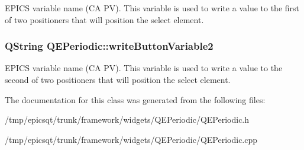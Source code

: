 \label{classQEPeriodic_a39ccfb959ab6a662a0b2e70be6be1ba7}
EPICS variable name (CA PV). This variable is used to write a value to the first of two positioners that will position the select element. \hypertarget{classQEPeriodic_a8e9f3750f759bd05031b4be4285c49d8}{
\subsubsection[{writeButtonVariable2}]{\setlength{\rightskip}{0pt plus 5cm}QString QEPeriodic::writeButtonVariable2}}
\label{classQEPeriodic_a8e9f3750f759bd05031b4be4285c49d8}
EPICS variable name (CA PV). This variable is used to write a value to the second of two positioners that will position the select element. 

The documentation for this class was generated from the following files:\begin{DoxyCompactItemize}
\item 
/tmp/epicsqt/trunk/framework/widgets/QEPeriodic/QEPeriodic.h\item 
/tmp/epicsqt/trunk/framework/widgets/QEPeriodic/QEPeriodic.cpp\end{DoxyCompactItemize}
